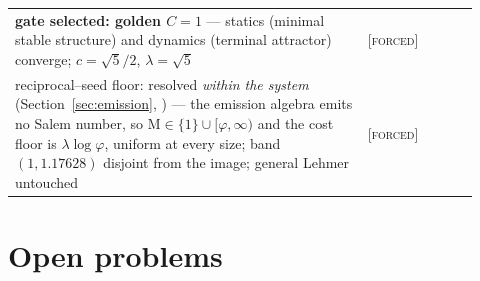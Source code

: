 \documentclass[11pt]{article}
\theoremstyle{plain}
\theoremstyle{definition}
\theoremstyle{remark}
\newcommand{\forced}{\textcolor{forcedc}{\textsc{[forced]}}}
\newcommand{\Mah}{\mathrm{M}}
\begin{document}
\begin{center}
\begin{tabular}{@{}p{0.70\linewidth}>{\raggedright\arraybackslash}p{0.22\linewidth}@{}}
\textbf{gate selected: golden $C=1$} --- statics (minimal stable structure) and dynamics (terminal attractor) converge; $c=\sqrt5/2$, $\lambda=\sqrt5$ & \forced \\
reciprocal--seed floor: resolved \emph{within the system} (Section~\ref{sec:emission}, \cite{EG}) --- the emission algebra emits no Salem number, so $\Mah\in\{1\}\cup[\varphi,\infty)$ and the cost floor is $\lambda\log\varphi$, uniform at every size; band $(1,1.17628)$ disjoint from the image; general Lehmer untouched & \forced \\
\bottomrule
\end{tabular}
\end{center}

\section{Open problems}\label{sec:open}
\end{document}
